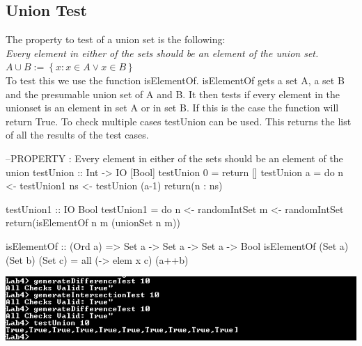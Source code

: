 \documentclass{article}
\begin{document}
{

\subsection*{Union Test}
The property to test of a union set is the following: \\ \emph{
Every element in either of the sets should be an element of the union set.
$ A \cup B := \left\{ x: x \in A \lor x \in B\right\} $ }\\

To test this we use the function isElementOf. isElementOf gets a set A, a set B and the presumable union set of A and B. It then tests if every element in the unionset is an element in set A or in set B. If this is the case the function will return True. To check multiple cases testUnion can be used. This returns the list of all the results of the test cases.

\begin{code}
--PROPERTY : Every element in either of the sets should be an element of the union
testUnion :: Int -> IO [Bool]
testUnion 0 = return []
testUnion a = do 	n <- testUnion1
			ns <- testUnion (a-1)			
			return(n : ns)

testUnion1 :: IO Bool
testUnion1 = do 	n <- randomIntSet
			m <- randomIntSet
			return(isElementOf n m (unionSet n m)) 

isElementOf :: (Ord a) => Set a -> Set a -> Set a -> Bool
isElementOf (Set a) (Set b) (Set c) = all (\x -> elem x c) (a++b)
\end{code}

\includegraphics{knipsel}

}
\end{document}
